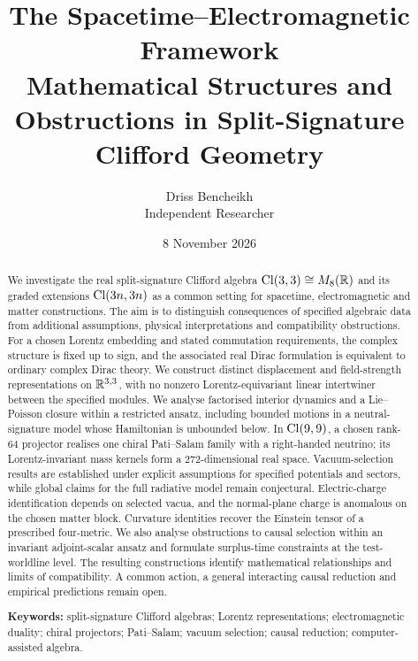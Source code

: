 

\title{\textbf{The Spacetime--Electromagnetic Framework}\\[6pt]
\large Mathematical Structures and Obstructions in Split-Signature Clifford Geometry}
\author{Driss Bencheikh\\[2pt]\normalsize Independent Researcher}
\date{8 November 2026}


\maketitle

\begin{abstract}
\noindent
We investigate the real split-signature Clifford algebra $\mathrm{Cl}(3,3)\cong M_8(\mathbb{R})$ and its graded extensions $\mathrm{Cl}(3n,3n)$ as a common setting
for spacetime, electromagnetic and matter constructions. The aim is to distinguish consequences of specified algebraic data from additional
assumptions, physical interpretations and compatibility obstructions. For a chosen Lorentz embedding and stated commutation requirements,
the complex structure is fixed up to sign, and the associated real Dirac formulation is equivalent to ordinary complex Dirac theory. We
construct distinct displacement and field-strength representations on $\mathbb{R}^{3,3}$, with no nonzero Lorentz-equivariant linear intertwiner
between the specified modules. We analyse factorised interior dynamics and a Lie--Poisson closure within a restricted ansatz, including
bounded motions in a neutral-signature model whose Hamiltonian is unbounded below. In $\mathrm{Cl}(9,9)$, a chosen rank-$64$ projector realises one
chiral Pati--Salam family with a right-handed neutrino; its Lorentz-invariant mass kernels form a $272$-dimensional real space.
Vacuum-selection results are established under explicit assumptions for specified potentials and sectors, while global claims for the full
radiative model remain conjectural. Electric-charge identification depends on selected vacua, and the normal-plane charge is anomalous on
the chosen matter block. Curvature identities recover the Einstein tensor of a prescribed four-metric. We also analyse obstructions to
causal selection within an invariant adjoint-scalar ansatz and formulate surplus-time constraints at the test-worldline level. The
resulting constructions identify mathematical relationships and limits of compatibility. A common action, a general interacting causal
reduction and empirical predictions remain open.

\medskip\noindent\textbf{Keywords:} split-signature Clifford algebras; Lorentz representations; electromagnetic duality; chiral projectors;
Pati--Salam; vacuum selection; causal reduction; computer-assisted algebra.
\end{abstract}

